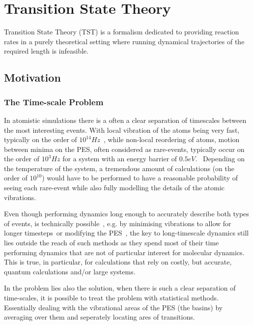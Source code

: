 \section{Transition State Theory}
\label{sec:tst}

Transition State Theory (TST) is a formalism dedicated to providing reaction rates in a purely theoretical setting where running dynamical trajectories of the required length is infeasible.

\expand

\subsection{Motivation}

\subsubsection{The Time-scale Problem}


In atomistic simulations there is a often a clear separation of timescales between the most interesting events.
With local vibration of the atoms being very fast, typically on the order of $10^{14} \unit{Hz}$~\citemiss,
while non-local reordering of atoms, motion between minima on the PES, often considered as rare-events, typically occur on the order of $10^3 \unit{Hz}$ for a system with an energy barrier of $0.5 \unit{eV}$.~\citemiss
Depending on the temperature of the system, a tremendous amount of calculations (on the order of $10^10$) would have to be performed to have a reasonable probability of seeing each rare-event while also fully modelling the details of the atomic vibrations.

Even though performing dynamics long enough to accurately describe both types of events, is technically possible~\citemiss, e.g. by minimising vibrations to allow for longer timesteps~\citemiss or modifying the PES~\cite{hyperdynamics-voter-1997}, the key to long-timescale dynamics still lies outside the reach of such methods as they spend most of their time performing dynamics that are not of particular interest for molecular dynamics.
This is true, in particular, for calculations that rely on costly, but accurate, quantum calculations and/or large systems.

In the problem lies also the solution, when there is such a clear separation of time-scales, it is possible to treat the problem with statistical methods.
Essentially dealing with the vibrational areas of the PES (the basins) by averaging over them and seperately locating ares of transitions.

